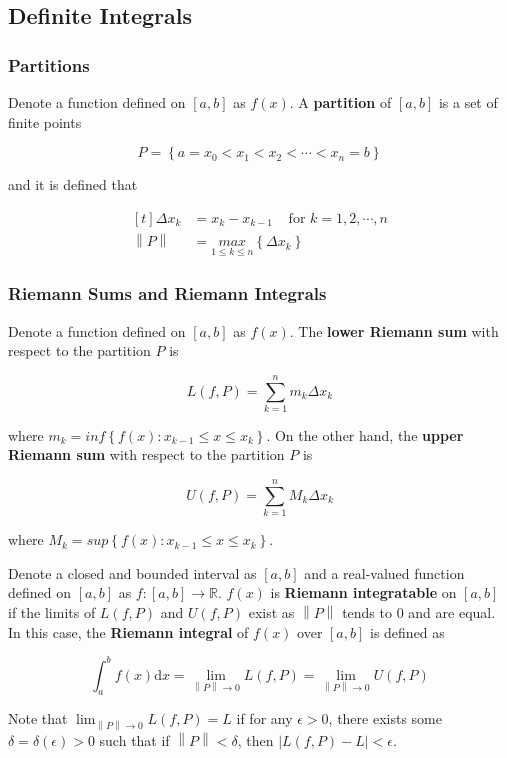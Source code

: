 \documentclass[a4paper,12pt]{article}
\newcommand{\s}{\vspace{1mm}}
\newcommand{\n}{\vspace{3mm}}
\newcommand{\R}{\mathbb{R}}
\newcommand{\diff}{\mathrm{d}}
\begin{document}
\subsection{Definite Integrals}
\subsubsection{Partitions}
Denote a function defined on $[a,b]$ as $f(x)$. A \textbf{partition} of $[a,b]$ is a set of finite points

$$P=\left\{ a=x_{0}<x_{1}<x_{2}<\cdots<x_{n}=b\right\}$$

and it is defined that

$$\begin{aligned}[t]
  \Delta x_{k}&=x_{k}-x_{k-1}\;\;\;\;\text{for }k=1,2,\cdots,n\\
  \left\| P\right\| &=\underset{1\leq k\leq n}{max}\left\{ \Delta x_{k}\right\}
\end{aligned}$$

\subsubsection{Riemann Sums and Riemann Integrals}
Denote a function defined on $[a,b]$ as $f(x)$. The \textbf{lower Riemann sum} with respect to the partition $P$ is

$$L(f,P)=\sum_{k=1}^{n}m_{k}\Delta x_{k}$$\s

where $m_{k}=inf\left\{ f(x):x_{k-1}\leq x\leq x_{k}\right\}$. On the other hand, the \textbf{upper Riemann sum} with respect to the partition $P$ is

$$U(f,P)=\sum_{k=1}^{n}M_{k}\Delta x_{k}$$\s

where $M_{k}=sup\left\{ f(x):x_{k-1}\leq x\leq x_{k}\right\}$.\n

Denote a closed and bounded interval as $[a,b]$ and a real-valued function defined on $[a,b]$ as $f: [a,b]\to\R$. $f(x)$ is \textbf{Riemann integratable} on $[a,b]$ if the limits of $L(f,P)$ and $U(f,P)$ exist as $\left\| P\right\|$ tends to $0$ and are equal. In this case, the \textbf{Riemann integral} of $f(x)$ over $[a,b]$ is defined as

$$\int_{a}^{b}f(x)\diff x=\lim_{\left\| P\right\| \to 0}L(f,P)=\lim_{\left\| P\right\| \to 0}U(f,P)$$\s

Note that $\lim_{\left\| P\right\| \to 0}L(f,P)=L$ if for any $\epsilon>0$, there exists some $\delta=\delta(\epsilon)>0$ such that if $\left\| P\right\| <\delta$, then $\left| L(f,P)-L \right| <\epsilon$.
\end{document}
